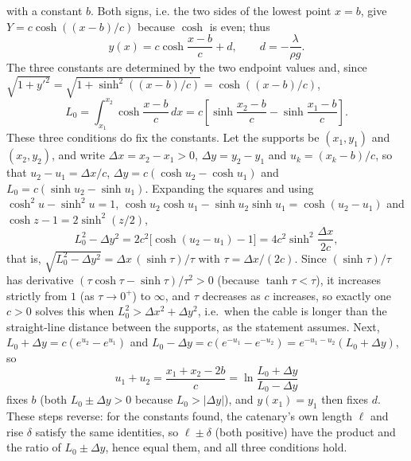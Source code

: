 with a constant $b$. Both signs, i.e. the two sides of the lowest
point $x=b$, give $Y=c\cosh((x-b)/c)$ because $\cosh$ is even; thus
\[
 \boxed{y(x)=c\cosh\frac{x-b}{c}+d},\qquad
 d=-\frac{\lambda}{\rho g}.
\]
The three constants are determined by the two endpoint values and,
since $\sqrt{1+y'^2}=\sqrt{1+\sinh^2((x-b)/c)}=\cosh((x-b)/c)$,
\[
 L_0=\int_{x_1}^{x_2}\cosh\frac{x-b}{c}\,dx
 =c\left[\sinh\frac{x_2-b}{c}
                 -\sinh\frac{x_1-b}{c}\right].
\]
These three conditions do fix the constants. Let the supports be
$(x_1,y_1)$ and $(x_2,y_2)$, and write
$\Delta x=x_2-x_1>0$, $\Delta y=y_2-y_1$ and $u_k=(x_k-b)/c$, so that
$u_2-u_1=\Delta x/c$, $\Delta y=c(\cosh u_2-\cosh u_1)$ and
$L_0=c(\sinh u_2-\sinh u_1)$. Expanding the squares and using
$\cosh^2u-\sinh^2u=1$,
$\cosh u_2\cosh u_1-\sinh u_2\sinh u_1=\cosh(u_2-u_1)$ and
$\cosh z-1=2\sinh^2(z/2)$,
\[
 L_0^2-\Delta y^2=2c^2\bigl[\cosh(u_2-u_1)-1\bigr]
 =4c^2\sinh^2\frac{\Delta x}{2c},
\]
that is, $\sqrt{L_0^2-\Delta y^2}=\Delta x\,(\sinh\tau)/\tau$ with
$\tau=\Delta x/(2c)$. Since $(\sinh\tau)/\tau$ has derivative
$(\tau\cosh\tau-\sinh\tau)/\tau^2>0$ (because $\tanh\tau<\tau$), it
increases strictly from $1$ (as $\tau\to0^+$) to $\infty$, and $\tau$
decreases as $c$ increases, so exactly one $c>0$ solves this when
$L_0^2>\Delta x^2+\Delta y^2$, i.e.\ when the cable is longer than the
straight-line distance between the supports, as the statement assumes.
Next, $L_0+\Delta y=c(e^{u_2}-e^{u_1})$ and
$L_0-\Delta y=c(e^{-u_1}-e^{-u_2})=e^{-u_1-u_2}(L_0+\Delta y)$, so
\[
 u_1+u_2=\frac{x_1+x_2-2b}{c}=\ln\frac{L_0+\Delta y}{L_0-\Delta y}
\]
fixes $b$ (both $L_0\pm\Delta y>0$ because $L_0>|\Delta y|$), and
$y(x_1)=y_1$ then fixes $d$. These steps reverse: for the constants
found, the catenary's own length $\ell$ and rise $\delta$ satisfy the
same identities, so $\ell\pm\delta$ (both positive) have the product
and the ratio of $L_0\pm\Delta y$, hence equal them, and all three
conditions hold.


